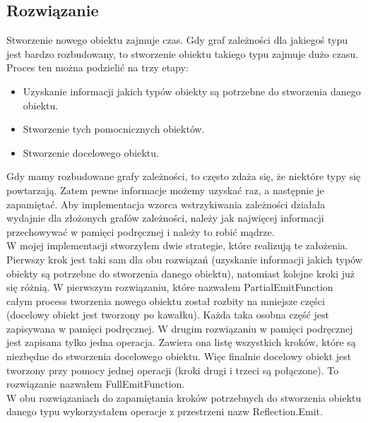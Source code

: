 \documentclass[12pt]{article}
\begin{document}
\subsection{Rozwiązanie}
Stworzenie nowego obiektu zajmuje czas. Gdy graf zależności dla jakiegoś typu jest bardzo rozbudowany, to stworzenie obiektu takiego typu zajmuje dużo czasu. Proces ten można podzielić na trzy etapy:
\begin{itemize}
	\item Uzyskanie informacji jakich typów obiekty są potrzebne do stworzenia danego obiektu.
	\item Stworzenie tych pomocnicznych obiektów.
	\item Stworzenie docelowego obiektu.
\end{itemize}
Gdy mamy rozbudowane grafy zależności, to często zdaża się, że niektóre typy się powtarzają. Zatem pewne informacje możemy uzyskać raz, a następnie je zapamiętać. Aby implementacja wzorca wstrzykiwania zależności działała wydajnie dla złożonych grafów zależności, należy jak najwięcej informacji przechowywać w pamięci podręcznej i należy to robić mądrze.\\
W mojej implementacji stworzyłem dwie strategie, które realizują te założenia. Pierwszy krok jest taki sam dla obu rozwiązań (uzyskanie informacji jakich typów obiekty są potrzebne do stworzenia danego obiektu), natomiast kolejne kroki już się różnią. W pierwszym rozwiązaniu, które nazwałem PartialEmitFunction całym process tworzenia nowego obiektu został rozbity na mniejsze części (docelowy obiekt jest tworzony po kawałku). Każda taka osobna część jest zapisywana w pamięci podręcznej. W drugim rozwiązaniu w pamięci podręcznej jest zapisana tylko jedna operacja. Zawiera ona listę wszystkich kroków, które są niezbędne do stworzenia docelowego obiektu. Więc finalnie docelowy obiekt jest tworzony przy pomocy jednej operacji (kroki drugi i trzeci są połączone). To rozwiązanie nazwałem FullEmitFunction.\\
W obu rozwiązaniach do zapamiętania kroków potrzebnych do stworzenia obiektu danego typu wykorzystałem operacje z przestrzeni nazw Reflection.Emit.

\clearpage
\end{document}
